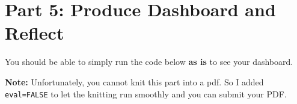 \documentclass[
]{article}
\newenvironment{Shaded}{\begin{snugshade}}{\end{snugshade}}
\newcommand{\AttributeTok}[1]{\textcolor[rgb]{0.13,0.29,0.53}{#1}}
\newcommand{\DocumentationTok}[1]{\textcolor[rgb]{0.56,0.35,0.01}{\textbf{\textit{#1}}}}
\newcommand{\FunctionTok}[1]{\textcolor[rgb]{0.13,0.29,0.53}{\textbf{#1}}}
\newcommand{\NormalTok}[1]{#1}
\newcommand{\OtherTok}[1]{\textcolor[rgb]{0.56,0.35,0.01}{#1}}
\newcommand{\SpecialCharTok}[1]{\textcolor[rgb]{0.81,0.36,0.00}{\textbf{#1}}}
\newcommand{\StringTok}[1]{\textcolor[rgb]{0.31,0.60,0.02}{#1}}
\begin{document}
\begin{Shaded}
\end{Shaded}

\section{Part 5: Produce Dashboard and
Reflect}\label{part-5-produce-dashboard-and-reflect}

You should be able to simply run the code below \textbf{as is} to see
your dashboard.

\textbf{Note:} Unfortunately, you cannot knit this part into a pdf. So I
added \texttt{eval=FALSE} to let the knitting run smoothly and you can
submit your PDF.
\end{document}
